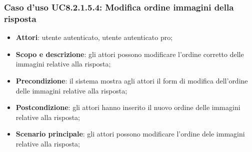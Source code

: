 \subsubsection{Caso d’uso UC8.2.1.5.4: Modifica ordine immagini della risposta}
\begin{itemize}
	\item\textbf{Attori}: utente autenticato, utente autenticato pro;
	\item\textbf{Scopo e descrizione}: gli attori possono modificare l'ordine corretto delle immagini relative alla risposta;
	\item\textbf{Precondizione}: il sistema mostra agli attori il form di modifica dell'ordine delle immagini relative alla risposta; 
	\item \textbf{Postcondizione}: gli attori hanno inserito il nuovo ordine delle immagini relative alla risposta;
	\item\textbf{Scenario principale}: gli attori possono modificare l'ordine dele immagini relative alla risposta;
\end{itemize}